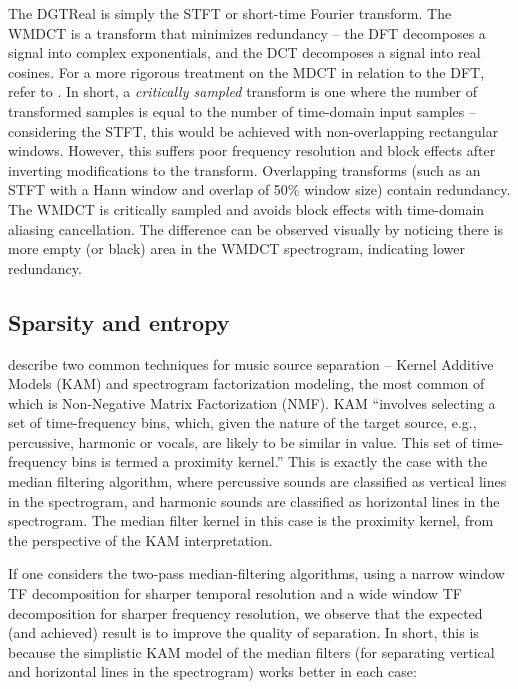 \documentclass[letter,12pt]{article}
\begin{document}
The DGTReal is simply the STFT or short-time Fourier transform. The WMDCT is a transform that minimizes redundancy -- the DFT decomposes a signal into complex exponentials, and the DCT decomposes a signal into real cosines. For a more rigorous treatment on the MDCT in relation to the DFT, refer to \cite{mdct}. In short, a \textit{critically sampled} transform is one where the number of transformed samples is equal to the number of time-domain input samples -- considering the STFT, this would be achieved with non-overlapping rectangular windows. However, this suffers poor frequency resolution and block effects after inverting modifications to the transform. Overlapping transforms (such as an STFT with a Hann window and overlap of 50\% window size) contain redundancy. The WMDCT is critically sampled and avoids block effects with time-domain aliasing cancellation. The difference can be observed visually by noticing there is more empty (or black) area in the WMDCT spectrogram, indicating lower redundancy.

\clearpage
\vfill

\subsection{Sparsity and entropy}
\label{sec:theorysparsity}

\citet{musicsepgood} describe two common techniques for music source separation -- Kernel Additive Models (KAM) and spectrogram factorization modeling, the most common of which is Non-Negative Matrix Factorization (NMF). KAM ``involves selecting a set of time-frequency bins, which, given the nature of the target source, e.g., percussive, harmonic or vocals, are likely to be similar in value. This set of time-frequency bins is termed a proximity kernel.'' This is exactly the case with the median filtering algorithm, where percussive sounds are classified as vertical lines in the spectrogram, and harmonic sounds are classified as horizontal lines in the spectrogram. The median filter kernel in this case is the proximity kernel, from the perspective of the KAM interpretation.

If one considers the two-pass median-filtering algorithms, using a narrow window TF decomposition for sharper temporal resolution and a wide window TF decomposition for sharper frequency resolution, we observe that the expected (and achieved) result is to improve the quality of separation. In short, this is because the simplistic KAM model of the median filters (for separating vertical and horizontal lines in the spectrogram) works better in each case:
\end{document}
